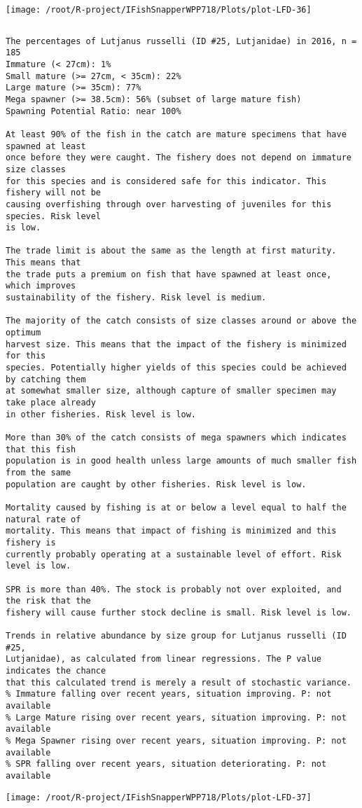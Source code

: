 \documentclass{report}\usepackage[]{graphicx}\usepackage[]{color}
\makeatletter
\def\maxwidth{ %
  \ifdim\Gin@nat@width>\linewidth
    \linewidth
  \else
    \Gin@nat@width
  \fi
}
\newenvironment{kframe}{%
 \def\at@end@of@kframe{}%
 \ifinner\ifhmode%
  \def\at@end@of@kframe{\end{minipage}}%
  \begin{minipage}{\columnwidth}%
 \fi\fi%
 \def\FrameCommand##1{\hskip\@totalleftmargin \hskip-\fboxsep
 \colorbox{shadecolor}{##1}\hskip-\fboxsep
     \hskip-\linewidth \hskip-\@totalleftmargin \hskip\columnwidth}%
 \MakeFramed {\advance\hsize-\width
   \@totalleftmargin\z@ \linewidth\hsize
   \@setminipage}}%
 {\par\unskip\endMakeFramed%
 \at@end@of@kframe}
\newenvironment{knitrout}{}{} %
\makeatother
\begin{document}
\begin{knitrout}
\texttt{[image: /root/R-project/IFishSnapperWPP718/Plots/plot-LFD-36]} 
\begin{kframe}\begin{verbatim}
\end{verbatim}
\end{kframe}
\clearpage
\newpage
\begin{kframe}\begin{verbatim}The percentages of Lutjanus russelli (ID #25, Lutjanidae) in 2016, n = 185
Immature (< 27cm): 1%
Small mature (>= 27cm, < 35cm): 22%
Large mature (>= 35cm): 77%
Mega spawner (>= 38.5cm): 56% (subset of large mature fish)
Spawning Potential Ratio: near 100%
 
At least 90% of the fish in the catch are mature specimens that have spawned at least
once before they were caught. The fishery does not depend on immature size classes
for this species and is considered safe for this indicator. This fishery will not be
causing overfishing through over harvesting of juveniles for this species. Risk level
is low.

The trade limit is about the same as the length at first maturity.  This means that
the trade puts a premium on fish that have spawned at least once, which improves
sustainability of the fishery. Risk level is medium.

The majority of the catch consists of size classes around or above the optimum
harvest size. This means that the impact of the fishery is minimized for this
species. Potentially higher yields of this species could be achieved by catching them
at somewhat smaller size, although capture of smaller specimen may take place already
in other fisheries. Risk level is low.

More than 30% of the catch consists of mega spawners which indicates that this fish
population is in good health unless large amounts of much smaller fish from the same
population are caught by other fisheries. Risk level is low.
 
Mortality caused by fishing is at or below a level equal to half the natural rate of
mortality. This means that impact of fishing is minimized and this fishery is
currently probably operating at a sustainable level of effort. Risk level is low.
 
SPR is more than 40%. The stock is probably not over exploited, and the risk that the
fishery will cause further stock decline is small. Risk level is low.
 
Trends in relative abundance by size group for Lutjanus russelli (ID #25,
Lutjanidae), as calculated from linear regressions. The P value indicates the chance
that this calculated trend is merely a result of stochastic variance.
% Immature falling over recent years, situation improving. P: not available
% Large Mature rising over recent years, situation improving. P: not available
% Mega Spawner rising over recent years, situation improving. P: not available
% SPR falling over recent years, situation deteriorating. P: not available
\end{verbatim}
\end{kframe}
\texttt{[image: /root/R-project/IFishSnapperWPP718/Plots/plot-LFD-37]} 


\end{knitrout}
\end{document}
